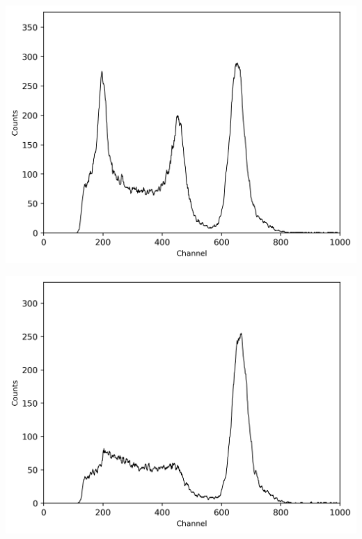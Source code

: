 \begin{center}
    \begin{adjustbox}{max width=\linewidth, keepaspectratio}
        \includegraphics[]{png/137Cskoinz1}
    \end{adjustbox}
    \label{fig:}
\end{center}
%
\begin{center}
    \begin{adjustbox}{max width=\linewidth, keepaspectratio}
        \includegraphics[]{png/137Cskoinz2}
    \end{adjustbox}
    \label{fig:}
\end{center}
%
